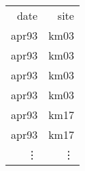 \begin{tabular}{rr}
date & {\color[HTML]{9B9B9B} site} \\
apr93 &{\color[HTML]{9B9B9B} km03} \\
apr93 & {\color[HTML]{9B9B9B} km03}  \\
apr93 & {\color[HTML]{9B9B9B} km03}  \\
apr93 & {\color[HTML]{9B9B9B} km03}  \\
apr93 & {\color[HTML]{9B9B9B} km17}  \\
apr93 & {\color[HTML]{9B9B9B} km17}  \\
\vdots & \vdots
\end{tabular}